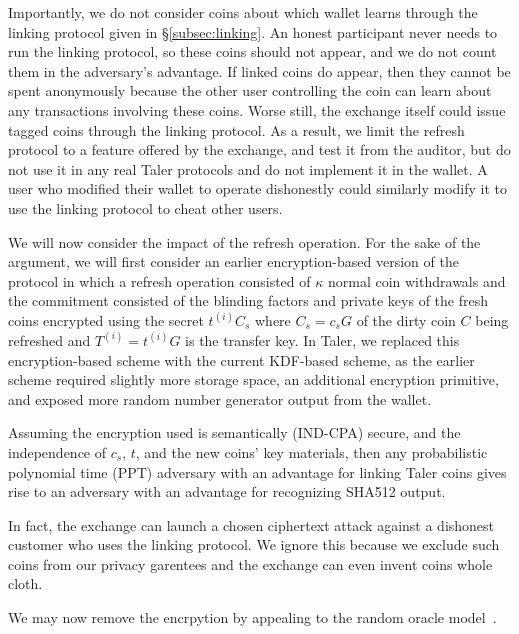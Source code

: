 \documentclass[sigconf, authordraft]{acmart}
\begin{document}
Importantly, we do not consider coins about which wallet learns
through the linking protocol given in \S\ref{subsec:linking}.
An honest participant never needs to run the linking protocol,
so these coins should not appear, and we do not count them in
the adversary's advantage.    If linked coins do appear, then
they cannot be spent anonymously because the other user controlling
the coin can learn about any transactions involving these coins.
Worse still, the exchange itself could issue tagged coins through
the linking protocol.  As a result, we limit the refresh protocol to
a feature offered by the exchange, and test it from the auditor, but
do not use it in any real Taler protocols and do not implement it in
the wallet.  A user who modified their wallet to operate dishonestly
could similarly modify it to use the linking protocol to cheat
other users.

\smallskip

We will now consider the impact of the refresh operation.
For the sake of the argument, we will first consider an earlier
encryption-based version of the protocol in which a refresh operation
consisted of $\kappa$ normal coin withdrawals and the commitment
consisted of the blinding factors and private keys of the fresh coins
encrypted using the secret $t^{(i)} C_s$ where $C_s = c_s G$ of the
dirty coin $C$ being refreshed and $T^{(i)} = t^{(i)} G$ is the
transfer key.
%
In Taler, we replaced this encryption-based scheme with the current KDF-based
scheme, as the earlier scheme required slightly more storage space, an
additional encryption primitive, and exposed more random number generator
output from the wallet.

\begin{proposition}
Assuming the encryption used is semantically (IND-CPA) secure, and
 the independence of $c_s$, $t$, and the new coins' key materials,
then any probabilistic polynomial time (PPT) adversary with an
advantage for linking Taler coins gives rise to an adversary with
 an advantage for recognizing SHA512 output.
\end{proposition}

In fact, the exchange can launch a chosen ciphertext attack against
a dishonest customer who uses the linking protocol.  We ignore this
because we exclude such coins from our privacy garentees and the
exchange can even invent coins whole cloth.

We may now remove the encrpytion by appealing to the random oracle
model~\cite{BR-RandomOracles}.
\end{document}

